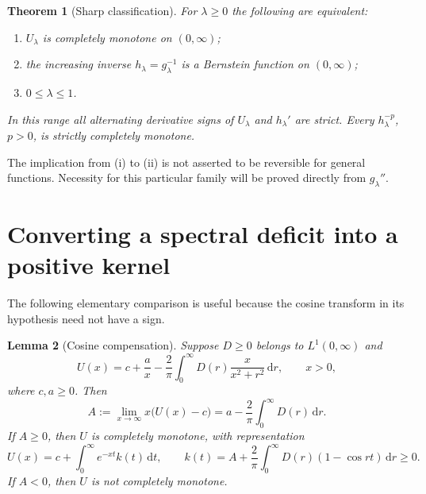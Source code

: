 \documentclass[11pt,a4paper]{article}
\newtheorem{theorem}{Theorem}[section]
\newtheorem{lemma}[theorem]{Lemma}
\theoremstyle{definition}\newtheorem{definition}[theorem]{Definition}
\theoremstyle{remark}\newtheorem{remark}[theorem]{Remark}
\newcommand{\dd}{\,\mathrm d}
\begin{document}
\begin{theorem}[Sharp classification]\label{thm:classification}
For $\lambda\ge0$ the following are equivalent:
\begin{enumerate}[label=\textup{(\roman*)}]
\item $U_\lambda$ is completely monotone on $(0,\infty)$;
\item the increasing inverse $h_\lambda=g_\lambda^{-1}$ is a
Bernstein function on $(0,\infty)$;
\item $0\le\lambda\le1$.
\end{enumerate}
In this range all alternating derivative signs of $U_\lambda$ and
$h_\lambda'$ are strict. Every $h_\lambda^{-p}$, $p>0$, is strictly
completely monotone.
\end{theorem}

The implication from (i) to (ii) is not asserted to be reversible
for general functions. Necessity for this particular family will
be proved directly from $g_\lambda''$.

\section{Converting a spectral deficit into a positive kernel}

The following elementary comparison is useful because the cosine
transform in its hypothesis need not have a sign.

\begin{lemma}[Cosine compensation]\label{lem:compensation}
Suppose $D\ge0$ belongs to $L^1(0,\infty)$ and
\begin{equation}\label{eq:comparison}
 U(x)=c+\frac a x-\frac2\pi\int_0^\infty
              D(r)\frac{x}{x^2+r^2}\dd r,
 \qquad x>0,
\end{equation}
where $c,a\ge0$. Then
\begin{equation}\label{eq:mass-coefficient}
 A:=\lim_{x\to\infty}x\bigl(U(x)-c\bigr)
   =a-\frac2\pi\int_0^\infty D(r)\dd r.
\end{equation}
If $A\ge0$, then $U$ is completely monotone, with representation
\begin{equation}\label{eq:positive-laplace}
 U(x)=c+\int_0^\infty e^{-xt}k(t)\dd t,\qquad
 k(t)=A+\frac2\pi\int_0^\infty D(r)(1-\cos rt)\dd r\ge0.
\end{equation}
If $A<0$, then $U$ is not completely monotone.
\end{lemma}
\end{document}
